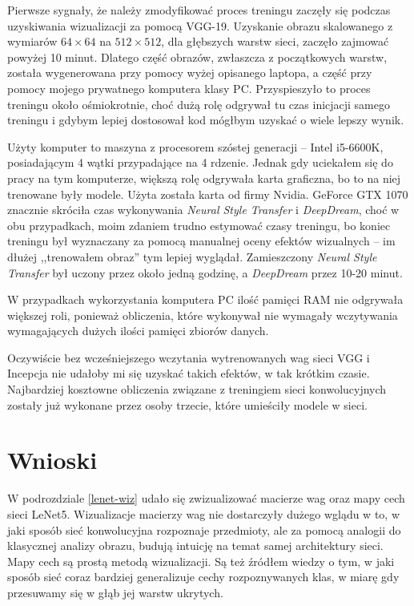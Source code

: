 Pierwsze sygnały, że należy zmodyfikować proces treningu zaczęły się podczas uzyskiwania wizualizacji za pomocą VGG-19.
Uzyskanie obrazu skalowanego z wymiarów \(64 \times 64\) na \(512 \times 512\), dla głębszych warstw sieci, zaczęło zajmować powyżej 10 minut.
Dlatego część obrazów, zwłaszcza z początkowych warstw, została wygenerowana przy pomocy wyżej opisanego laptopa, a część przy pomocy mojego prywatnego komputera klasy PC. Przyspieszyło to proces treningu około ośmiokrotnie, choć dużą rolę odgrywał tu czas inicjacji samego treningu i gdybym lepiej dostosował kod mógłbym uzyskać o wiele lepszy wynik.

Użyty komputer to maszyna z procesorem szóstej generacji -- Intel i5-6600K, posiadającym 4 wątki przypadające na 4 rdzenie. Jednak gdy uciekałem się do pracy na tym komputerze, większą rolę odgrywała karta graficzna, bo to na niej trenowane były modele. Użyta została karta od firmy Nvidia. GeForce GTX 1070 znacznie skróciła czas wykonywania \textit{Neural Style Transfer} i \textit{DeepDream}, choć w obu przypadkach, moim zdaniem trudno estymować czasy treningu, bo koniec treningu był wyznaczany za pomocą
manualnej oceny efektów wizualnych -- im dłużej ,,trenowałem obraz'' tym lepiej wyglądał. Zamieszczony \textit{Neural Style Transfer} był uczony przez około jedną godzinę, a \textit{DeepDream} przez 10-20 minut.

W przypadkach wykorzystania komputera PC ilość pamięci RAM nie odgrywała większej roli, ponieważ obliczenia, które wykonywał nie wymagały wczytywania wymagających dużych ilości pamięci zbiorów danych.

Oczywiście bez wcześniejszego wczytania wytrenowanych wag sieci VGG i Incepcja nie udałoby mi się uzyskać takich efektów, w tak krótkim czasie. Najbardziej kosztowne obliczenia związane z treningiem sieci konwolucyjnych zostały już wykonane przez osoby trzecie, które umieściły modele w sieci.

\section{Wnioski}
W podrozdziale \ref{lenet-wiz} udało się zwizualizować macierze wag oraz mapy cech sieci LeNet5. Wizualizacje macierzy wag nie dostarczyły dużego wglądu w to, w jaki sposób sieć konwolucyjna rozpoznaje przedmioty, ale za pomocą analogii do klasycznej analizy obrazu, budują intuicję na temat samej architektury sieci. Mapy cech są prostą metodą wizualizacji. Są też źródłem wiedzy o tym, w jaki sposób sieć coraz bardziej generalizuje cechy rozpoznywanych klas, w miarę gdy przesuwamy się
w głąb jej warstw ukrytych.  

